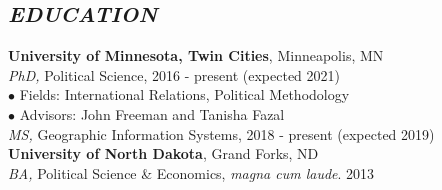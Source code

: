 \documentclass[margin, 10pt]{res} %
\begin{document}
\begin{resume}


\section{\footnotesize \textit{EDUCATION}}
\textbf{University of Minnesota, Twin Cities}, Minneapolis, MN\\
\-\hspace{5mm} {\sl PhD,} Political Science, 2016 - present \hfill  (expected 2021)\\
\-\hspace{10mm} $\bullet$ Fields: International Relations, Political Methodology\\
\-\hspace{10mm} $\bullet$ Advisors: John Freeman and Tanisha Fazal\\
\-\hspace{5mm} {\sl MS,} Geographic Information Systems, 2018 - present \hfill (expected 2019)\\
\textbf{University of North Dakota}, Grand Forks, ND\\
\-\hspace{5mm} {\sl BA,} Political Science \& Economics, \textit{magna cum laude}. \hfill 2013

 

\end{resume}
\end{document}
